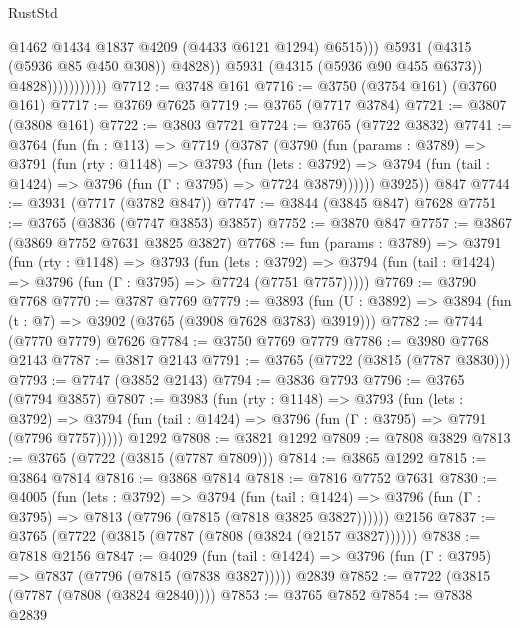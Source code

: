 \begin{lexlean}{RustStd}
\begin{coremodule}
                                    @1462
                                    @1434
                                    @1837
                                    @4209
                                    (@4433 @6121 @1294)
                                    @6515)))
                              @5931
                              (@4315 (@5936 @85 @450 @308))
                              @4828))
                          @5931
                          (@4315 (@5936 @90 @455 @6373))
                          @4828)))))))))))
@7712 := @3748 @161
@7716 := @3750 (@3754 @161) (@3760 @161)
@7717 := @3769 @7625
@7719 := @3765 (@7717 @3784)
@7721 := @3807 (@3808 @161)
@7722 := @3803 @7721
@7724 := @3765 (@7722 @3832)
@7741 := @3764
    (fun (fn : @113) =>
    @7719
      (@3787
        (@3790
          (fun (params : @3789) =>
          @3791
            (fun (rty : @1148) =>
            @3793
              (fun (lets : @3792) =>
              @3794 (fun (tail : @1424) => @3796 (fun (Γ : @3795) => @7724 @3879))))))
        @3925))
    @847
@7744 := @3931 (@7717 (@3782 @847))
@7747 := @3844 (@3845 @847) @7628
@7751 := @3765 (@3836 (@7747 @3853) @3857)
@7752 := @3870 @847
@7757 := @3867 (@3869 @7752 @7631 @3825 @3827)
@7768 := fun (params : @3789) =>
  @3791
    (fun (rty : @1148) =>
    @3793
      (fun (lets : @3792) =>
      @3794 (fun (tail : @1424) => @3796 (fun (Γ : @3795) => @7724 (@7751 @7757)))))
@7769 := @3790 @7768
@7770 := @3787 @7769
@7779 := @3893 (fun (U : @3892) => @3894 (fun (t : @7) => @3902 (@3765 (@3908 @7628 @3783) @3919)))
@7782 := @7744 (@7770 @7779) @7626
@7784 := @3750 @7769 @7779
@7786 := @3980 @7768 @2143
@7787 := @3817 @2143
@7791 := @3765 (@7722 (@3815 (@7787 @3830)))
@7793 := @7747 (@3852 @2143)
@7794 := @3836 @7793
@7796 := @3765 (@7794 @3857)
@7807 := @3983
    (fun (rty : @1148) =>
    @3793
      (fun (lets : @3792) =>
      @3794 (fun (tail : @1424) => @3796 (fun (Γ : @3795) => @7791 (@7796 @7757)))))
    @1292
@7808 := @3821 @1292
@7809 := @7808 @3829
@7813 := @3765 (@7722 (@3815 (@7787 @7809)))
@7814 := @3865 @1292
@7815 := @3864 @7814
@7816 := @3868 @7814
@7818 := @7816 @7752 @7631
@7830 := @4005
    (fun (lets : @3792) =>
    @3794
      (fun (tail : @1424) => @3796 (fun (Γ : @3795) => @7813 (@7796 (@7815 (@7818 @3825 @3827))))))
    @2156
@7837 := @3765 (@7722 (@3815 (@7787 (@7808 (@3824 (@2157 @3827))))))
@7838 := @7818 @2156
@7847 := @4029
    (fun (tail : @1424) => @3796 (fun (Γ : @3795) => @7837 (@7796 (@7815 (@7838 @3827)))))
    @2839
@7852 := @7722 (@3815 (@7787 (@7808 (@3824 @2840))))
@7853 := @3765 @7852
@7854 := @7838 @2839

\end{coremodule}
\end{lexlean}
